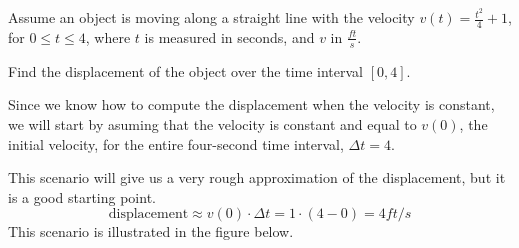 \documentclass{ximera}
\begin{document}
\begin{example}
  Assume an object is moving along a straight line with the velocity
  $v(t)=\frac{t^2}{4}+1$, for $0\le t\le4$, where $t$ is measured in
  seconds, and $v$ in $\frac{\unit{ft}}{\unit{s}}$.

  Find the displacement of the object over the time interval $[0,4]$.
  \begin{explanation}
   Since we know how to compute the displacement when the velocity is
   constant, we will start by asuming that the velocity is constant
   and equal to $v(0)$, the initial velocity, for the entire
   four-second time interval, $\Delta t=4$.

   This scenario will give us a very rough approximation of the
   displacement, but it is a good starting point.
  \[
   \text{displacement}\approx v(0)\cdot\Delta t=1\cdot(4-0)=4 \unit{ft}/\unit{s}
  \]
This scenario is illustrated in the figure below.
 \begin{image}
\end{image}
\end{explanation}
\end{example}
\end{document}
